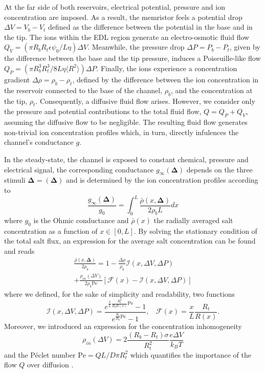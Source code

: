 \documentclass[reprint,superscriptaddress,prb,showkeys]{revtex4-2}
\newcommand{\brac}[1]{\left(#1 \right)} %
\begin{document}
At the far side of both reservoirs, electrical potential, pressure and ion concentration are imposed. As a result, the memristor feels a potential drop $\Delta V = V_b - V_t$ defined as the difference between the potential in the base and in the tip. The ions within the EDL region generate an electro-osmotic fluid flow $Q_V = (\pi R_b R_t\epsilon\psi_0/L\eta)\Delta V$. Meanwhile, the pressure drop $\Delta P = P_b - P_t$, given by the difference between the base and the tip pressure, induces a Poiseuille-like flow $Q_P = (\pi R_b^3 R_t^3/8L\eta\langle R^2\rangle)\Delta P$. Finally, the ions experience a concentration gradient $\Delta \rho = \rho_b - \rho_t$, defined by the difference between the ion concentration in the reservoir connected to the base of the channel, $\rho_b$, and the concentration at the tip, $\rho_t$. Consequently, a diffusive fluid flow arises. However, we consider only the pressure and potential contributions to the total fluid flow, $Q = Q_P + Q_V$, assuming the diffusive flow to be negligible.  The resulting fluid flow generates non-trivial ion concentration profiles which, in turn, directly infulences the channel's conductance $g$. 

In the steady-state, the channel is exposed to constant chemical, pressure and electrical signal, the corresponding conductance $g_{\infty}\brac{\boldsymbol{\Delta}}$ depends on the three stimuli $\boldsymbol{\Delta}= (\boldsymbol{\Delta})$ and is determined by the ion concentration profiles according to 
\[
\frac{g_{\infty}\brac{\boldsymbol{\Delta}}}{g_0} = \int_0^{L} \frac{\bar{\rho}\left(x, \boldsymbol{\Delta}\right)}{2\rho_b L} dx                                           
\]
where $g_0$ is the Ohmic conductance and $\bar{\rho}(x)$ the radially averaged salt concentration as a function of $x\in[0,L]$\cite{Rene_IonicNeuromorphic}. By solving the stationary condition of the total salt flux, an expression for the average salt concentration can be found and reads
\begin{multline}
\frac{\bar{\rho}\left(x, \boldsymbol{\Delta}\right)}{2\rho_b} = 1 - \frac{\Delta \rho}{\rho_b} \mathcal{I}\left(x, \Delta V, \Delta P\right) \\
 + \frac{ \rho_{in}\left( \Delta V \right) }{2\rho_b \text{Pe}} \left[ \mathcal{F}(x) - \mathcal{I}\left(x, \Delta V, \Delta P\right) \right]
\label{eq:rho_average}
\end{multline}
where we defined, for the sake of simplicity and readability, two functions
\[
\mathcal{I}\left(x, \Delta V, \Delta P\right) = \frac{e^{\frac{x}{L}\frac{R_t^2}{R_b R(x)} \text{Pe}}-1}{e^{\frac{R_t}{R_b} \text{Pe}}-1}, \ \ \ \ \mathcal{F}(x) = \frac{x}{L}\frac{R_t}{R(x)}.
\]
Moreover, we introduced an expression for the concentration inhomogeneity 
\[
\rho_{in}\brac{\Delta V} = 2\frac{(R_b-R_t)\sigma}{R_t^2}\frac{e\Delta V}{k_B T}
\]
and the Péclet number
$
\text{Pe} = QL/D\pi R_t^2
$
which quantifies the importance of the flow $Q$ over diffusion \cite{Rene_PressureSensitive}.
\end{document}
